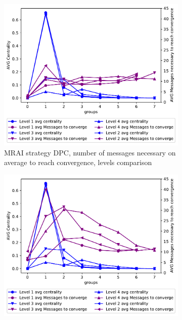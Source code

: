 \begin{figure}[h]
     \centering
     \begin{subfigure}[b]{0.45\textwidth}
         \centering
         \includegraphics[width=\textwidth]{images/hierarchy/dpc_all_levels_comparison_centVSmsg.pdf}
		 \caption{\ac{MRAI} strategy \ac{DPC}, number of messages necessary on
			average to reach convergence, levels comparison}
         \label{fig:different_levels_comparison_dpc_msg}
     \end{subfigure}
     \begin{subfigure}[b]{0.45\textwidth}
         \centering
         \includegraphics[width=\textwidth]{images/hierarchy/reverse_dpc_all_levels_comparison_centVSmsg.pdf}

\end{subfigure}
\end{figure}
